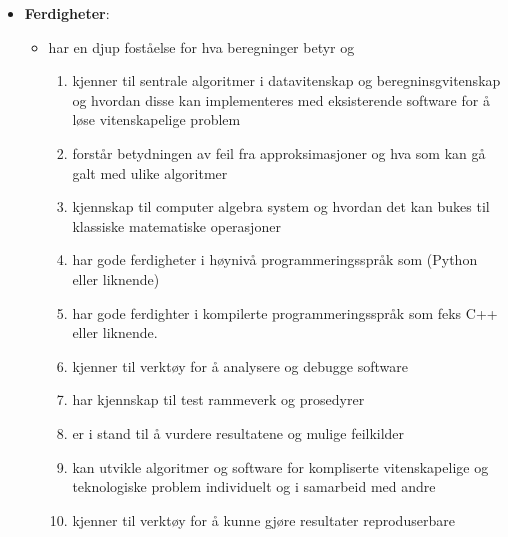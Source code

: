 \documentclass{article}
\begin{document}
\begin{itemize}
    \noindent
  \item \textbf{Ferdigheter}:
    \begin{itemize}
      \item har en djup foståelse for hva beregninger betyr og 
        \begin{enumerate}
          \item kjenner til sentrale algoritmer i datavitenskap og beregninsgvitenskap og hvordan disse kan implementeres med eksisterende software for å løse vitenskapelige problem
          \item forstår betydningen av feil fra approksimasjoner og hva som kan gå galt med ulike algoritmer
          \item kjennskap til computer algebra system og hvordan det kan bukes til klassiske matematiske operasjoner
          \item har gode ferdigheter i høynivå programmeringsspråk som (Python eller liknende)
          \item har gode ferdighter i kompilerte programmeringsspråk som feks C++ eller liknende.
          \item kjenner til verktøy for å analysere og debugge software
          \item har kjennskap til test rammeverk og prosedyrer
          \item er i stand til å vurdere resultatene  og mulige feilkilder
          \item kan utvikle algoritmer og software for kompliserte vitenskapelige og teknologiske problem individuelt og i samarbeid med andre
          \item kjenner til verktøy for å kunne gjøre resultater reproduserbare
        \end{enumerate}
    \end{itemize}
\end{itemize}
\end{document}
